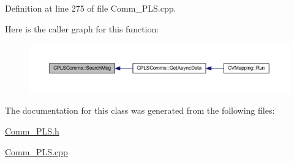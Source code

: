 Definition at line 275 of file Comm\+\_\+\+P\+L\+S.\+cpp.

Here is the caller graph for this function\+:\nopagebreak
\begin{figure}[H]
\begin{center}
\leavevmode
\includegraphics[width=350pt]{class_c_p_l_s_comms_ae0cd51de8a24b261389b6f89b4b80e51_icgraph}
\end{center}
\end{figure}


The documentation for this class was generated from the following files\+:\begin{DoxyCompactItemize}
\item 
\mbox{\hyperlink{_comm___p_l_s_8h}{Comm\+\_\+\+P\+L\+S.\+h}}\item 
\mbox{\hyperlink{_comm___p_l_s_8cpp}{Comm\+\_\+\+P\+L\+S.\+cpp}}\end{DoxyCompactItemize}
